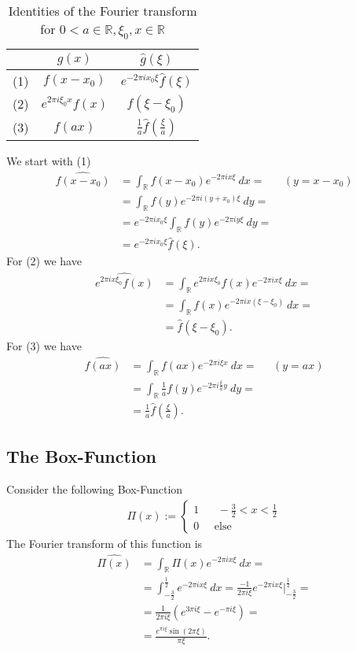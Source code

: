 \documentclass[a4paper]{article}
\begin{document}
\begin{table}[h!]
\centering
\begin{tabular}{| l | c | c |}
\hline
  & $g(x)$ & $\hat{g}(\xi)$ \\ \hline \hline
(1) & $f(x-x_0)$ & $e^{-2\pi ix_0 \xi} \hat{f}(\xi)$ \\ \hline
(2) & $e^{2\pi i \xi_0 x} f(x)$ & $f(\xi - \xi_0)$ \\ \hline
(3) & $f(ax)$ & $\frac{1}{a} \hat{f}(\frac{\xi}{a})$\\ \hline
\end{tabular}
    \caption{Identities of the Fourier transform for $0 < a\in\mathbb{R},
    \xi_0, x \in \mathbb{R}$}
\end{table}
We start with (1)
\begin{align}
    \widehat{f(x-x_0)}
    &= \int_\mathbb{R} f(x-x_0) e^{-2\pi i x \xi}\ dx=
    \;\;\;\;\;\; (y = x-x_0)\\
    &= \int_\mathbb{R} f(y) e^{-2\pi i (y+x_0) \xi}\
    dy=\\
    &= e^{-2\pi i x_0 \xi} \int_\mathbb{R}f(y)e^{-2\pi i y
    \xi}\ dy=\\
    &= e^{-2\pi i x_0 \xi} \hat{f}(\xi).
\end{align}
For (2) we have
\begin{align}
    \widehat{e^{2\pi i x \xi_0} f(x)}
    &= \int_\mathbb{R} e^{2\pi i x \xi_0} f(x) e^{-2\pi i x \xi}\ dx =\\
    &= \int_\mathbb{R} f(x) e^{-2\pi i x (\xi -\xi_0)}\ dx=\\
    &= \hat{f}(\xi - \xi_0).
\end{align}
For (3) we have
\begin{align}
    \widehat{f(ax)}
    &= \int_\mathbb{R} f(ax) e^{-2\pi i \xi x}\ dx = \;\;\;\;\; (y=ax)\\
    &= \int_\mathbb{R} \frac{1}{a}f(y) e^{-2\pi i \frac{\xi}{a} y}\ dy=\\
    &= \frac{1}{a} \hat{f}(\frac{\xi}{a}).
\end{align}
\subsection{The Box-Function}
Consider the following Box-Function
\begin{align}
    \Pi(x) :=
    \begin{cases}
        1\;\;\;\;\;\; -\frac{3}{2} < x < \frac{1}{2}\\
        0\;\;\;\;\; \text{else}
    \end{cases}
\end{align}
The Fourier transform of this function is
\begin{align}
    \widehat{\Pi(x)}
    &= \int_\mathbb{R} \Pi(x) e^{-2\pi i x\xi}\ dx=\\
    &= \int_{-\frac{3}{2}}^{\frac{1}{2}} e^{-2\pi i x \xi}\ dx
    =\frac{-1}{2\pi i \xi} e^{-2\pi i x\xi}
    \bigg|_{-\frac{3}{2}}^{\frac{1}{2}}=\\
    &= \frac{1}{2\pi i \xi} \left(e^{3\pi i \xi} - e^{-\pi i \xi}\right)=\\
    &= \frac{e^{\pi i \xi}\sin(2\pi\xi)}{\pi \xi}.
\end{align}

\end{document}
